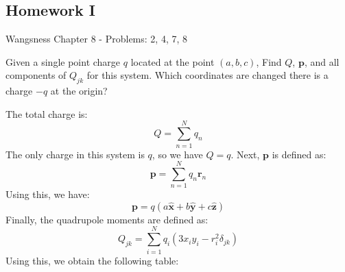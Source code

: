 \documentclass[crop=false,class=book,oneside]{standalone}
\begin{document}
        \subsection{Homework I}
            Wangsness Chapter 8 - Problems: 2, 4, 7, 8
            \begin{problem}
                \label{problem:EMAG_II_Wangsnes_8_2}
                Given a single point charge $q$ located at the
                point $(a,b,c)$, Find $Q$, $\mathbf{p}$, and
                all components of $Q_{jk}$ for this system. Which
                coordinates are changed there is a charge $\minus{q}$
                at the origin?
            \end{problem}
            \begin{solution}
                The total charge is:
                \begin{equation}
                    Q=\sum_{n=1}^{N}q_{n}
                \end{equation}
                The only charge in this system is $q$, so we have
                $Q=q$. Next, $\mathbf{p}$ is defined as:
                \begin{equation}
                    \mathbf{p}=
                    \sum_{n=1}^{N}q_{n}\mathbf{r}_{n}
                \end{equation}
                Using this, we have:
                \begin{equation}
                    \mathbf{p}=q(a\hat{\mathbf{x}}+
                                 b\hat{\mathbf{y}}+
                                 c\hat{\mathbf{z}})
                \end{equation}
                Finally, the quadrupole moments are defined as:
                \begin{equation}
                    Q_{jk}=\sum_{i=1}^{N}
                        q_{i}(3x_{i}y_{i}-r^{2}_{i}\delta_{jk})
                \end{equation}
                Using this, we obtain the following table:
                \begin{table}[H]
                    \centering
                    \captionsetup{type=table}
\end{table}
\end{solution}
\end{document}
